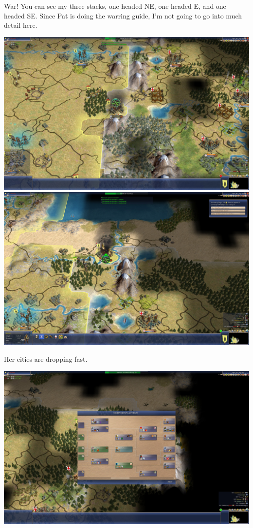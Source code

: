 \documentclass[10pt]{article}
\begin{document}
War! You can see my three stacks, one headed NE, one headed E, and one headed SE. Since Pat is doing the warring
guide, I'm not going to go into much detail here.

\includegraphics[width=1.0\textwidth]{131}
\includegraphics[width=1.0\textwidth]{132}

Her cities are dropping fast.

\includegraphics[width=1.0\textwidth]{133}
\end{document}
